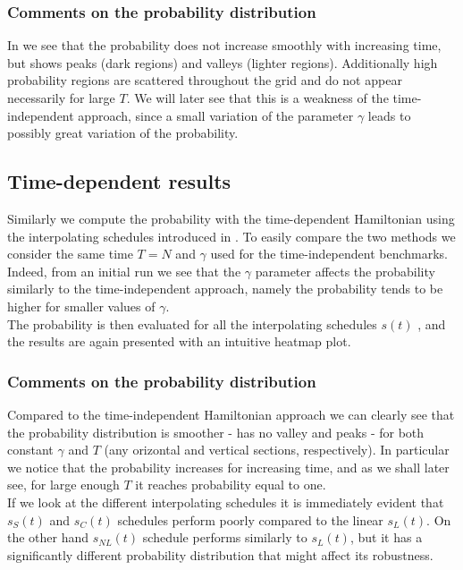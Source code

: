         \subsubsection*{Comments on the probability distribution}
        In  we see that the probability does not increase smoothly with increasing time, but shows peaks (dark regions) and valleys (lighter regions). Additionally high probability regions are scattered throughout the grid and do not appear necessarily for large $T$. We will later see that this is a weakness of the time-independent approach, since a small variation of the parameter $\gamma$ leads to possibly great variation of the probability.

    \subsection{Time-dependent results}\label{subsec:time_dependent_results}
        Similarly we compute the probability with the time-dependent Hamiltonian using the interpolating schedules introduced in . To easily compare the two methods we consider the same time $T=N$ and $\gamma$ used for the time-independent benchmarks. Indeed, from an initial run we see that the $\gamma$ parameter affects the probability similarly to the time-independent approach, namely the probability tends to be higher for smaller values of $\gamma$.\\
        The probability is then evaluated for all the interpolating schedules $s(t)$ , and the results are again presented with an intuitive heatmap plot.\\
        

        \subsubsection*{Comments on the probability distribution}
        Compared to the time-independent Hamiltonian approach we can clearly see that the probability distribution is smoother - has no valley and peaks - for both constant $\gamma$ and $T$ (any orizontal and vertical sections, respectively). In particular we notice that the probability increases for increasing time, and as we shall later see, for large enough $T$ it reaches probability equal to one.\\ If we look at the different interpolating schedules it is immediately evident that $s_S(t)$ and $s_C(t)$ schedules perform poorly compared to the linear $s_L(t)$. On the other hand $s_{NL}(t)$ schedule performs similarly to $s_L(t)$, but it has a significantly different probability distribution that might affect its robustness.

